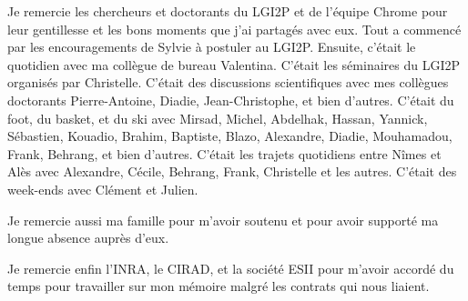 Je remercie les chercheurs et doctorants du LGI2P et de l'équipe Chrome pour leur gentillesse et les bons moments que j'ai partagés avec eux. Tout a commencé par les encouragements de Sylvie à postuler au LGI2P. Ensuite, c'était le quotidien avec ma collègue de bureau Valentina. C'était les séminaires du LGI2P organisés par Christelle. C'était des discussions scientifiques avec mes collègues doctorants Pierre-Antoine, Diadie, Jean-Christophe, et bien d'autres. C'était du foot, du basket, et du ski avec Mirsad, Michel, Abdelhak, Hassan, Yannick, Sébastien, Kouadio, Brahim, Baptiste, Blazo, Alexandre, Diadie, Mouhamadou, Frank, Behrang, et bien d'autres. C'était les trajets quotidiens entre Nîmes et Alès avec Alexandre, Cécile, Behrang, Frank, Christelle et les autres. C'était des week-ends avec Clément et Julien. 

Je remercie aussi ma famille pour m'avoir soutenu et pour avoir supporté ma longue absence auprès d'eux. 

Je remercie enfin l'INRA, le CIRAD, et la société ESII pour m'avoir accordé du temps pour travailler sur mon mémoire malgré les contrats qui nous liaient.
